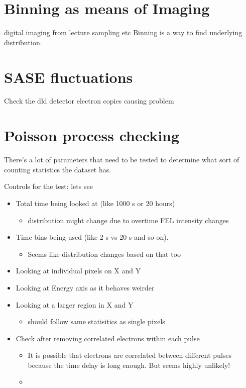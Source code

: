 \section{Binning as means of Imaging}
digital imaging from lecture
sampling etc
Binning is a way to find underlying distribution.


\section{SASE fluctuations}

Check the dld detector electron copies causing problem

\section{Poisson process checking}

There's a lot of parameters that need to be tested to determine what sort of counting statistics the dataset has.

Controls for the test:
lets see
\begin{itemize}
    \item Total time being looked at (like 1000 s or 20 hours)
    \begin{itemize}
        \item distribution might change due to overtime FEL intensity changes
    \end{itemize}
    \item Time bins being used (like 2 s vs 20 s and so on).
    \begin{itemize}
        \item Seems like distribution changes based on that too
    \end{itemize}
    \item Looking at individual pixels on X and Y
    \item Looking at Energy axis as it behaves weirder
    \item Looking at a larger region in X and Y 
    \begin{itemize}
        \item should follow same statisitics as single pixels
    \end{itemize}
    \item Check after removing correlated electrons within each pulse
    \begin{itemize}
        \item It is possible that electrons are correlated between different pulses because the time delay is long enough. But seems highly unlikely!
    \end{itemize}
    \begin{itemize}
        \item 
    \end{itemize}
\end{itemize}


